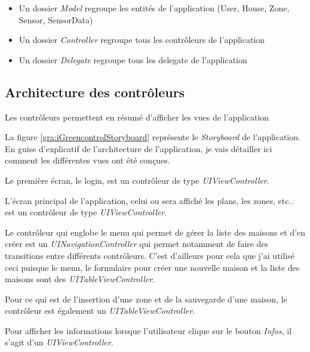 \begin{itemize}
  \item Un dossier \emph{Model} regroupe les entités de l'application (User, House, Zone, Sensor, SensorData)
  \item Un dossier \emph{Controller} regroupe tous les contrôleurs de l'application
  \item Un dossier \emph{Delegate} regroupe tous les delegate de l'application
\end{itemize}


\subsection{Architecture des contrôleurs} %
\label{sub:architecture_de_l_application}
Les contrôleurs permettent en résumé d'afficher les vues de l'application

\medskip

La figure \ref{gra:iGreencontrolStoryboard} représente le \emph{Storyboard} de l'application. En guise d'explicatif de l'architecture de l'application, je vais détailler ici comment les différentes vues ont été conçues.

\medskip

Le première écran, le login, est un contrôleur de type \emph{UIViewController}.

\medskip

L'écran principal de l'application, celui ou sera affiché les plans, les zones, etc.. est un contrôleur de type \emph{UIViewController}.

\medskip

Le contrôleur qui englobe le menu qui permet de gérer la liste des maisons et d'en créer est un \emph{UINavigationController} qui permet notamment de faire des transitions entre différents contrôleurs. C'est d'ailleurs pour cela que j'ai utilisé ceci puisque le menu, le formulaire pour créer une nouvelle maison et la liste des maisons sont des \emph{UITableViewController}.

\medskip

Pour ce qui est de l'insertion d'une zone et de la sauvegarde d'une maison, le contrôleur est également un \emph{UITableViewController}.

\medskip

Pour afficher les informations lorsque l'utilisateur clique sur le bouton \emph{Infos}, il s'agit d'un \emph{UIViewController}.

